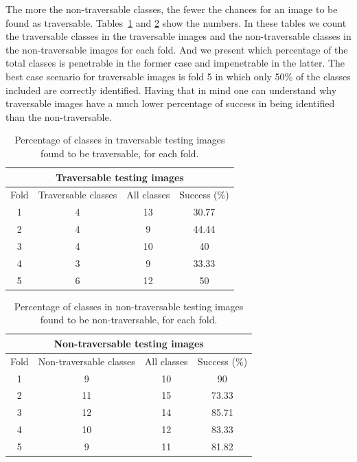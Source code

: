 \documentclass[12pt,a4paper,table,dvipsnames,tikz]{report}
\newcommand{\bl}[1]{{\hypersetup{linkcolor=blue}#1}}
\begin{document}
	The more the non-traversable classes, the fewer the chances for an image to be found as 
	traversable. Tables~\bl{\ref{table:trav.classes}} and \bl{\ref{table:obst.classes}} show 
	the numbers. In these tables we count the traversable classes in the traversable images 
	and the non-traversable classes in the non-traversable images for each fold. And we present 
	which percentage of the total classes is penetrable in the former case and impenetrable 
	in the latter. The best case scenario for traversable images is fold 5 in which only 50\% 
	of the classes included are correctly identified. Having that in mind one can understand 
	why traversable images have a much lower percentage of success in being identified than 
	the non-traversable.
	\\
	
	
	\begin{table}[h!]
		\centering
		\begin{tabular}{|c|c|c|c|}
			\hline
			\multicolumn{4}{|c|}{Traversable testing images}\\
			\hline
			Fold & Traversable classes & All classes & Success (\%)\\
			\hline
			1 & 4 & 13 & 30.77\\
			\hline
			2 & 4 & 9 & 44.44\\
			\hline
			3 & 4 & 10 & 40\\
			\hline
			4 & 3 & 9 & 33.33\\
			\hline
			5 & 6 & 12 & 50\\
			\hline
		\end{tabular}
		\caption{Percentage of classes in traversable testing images found to be traversable, 
			for each fold.}
		\label{table:trav.classes}
	\end{table}
	
	\begin{table}[h!]
		\centering
		\begin{tabular}{|c|c|c|c|}
			\hline
			\multicolumn{4}{|c|}{Non-traversable testing images}\\
			\hline
			Fold & Non-traversable classes & All classes & Success (\%)\\
			\hline
			1 & 9 & 10 & 90\\
			\hline
			2 & 11 & 15 & 73.33\\
			\hline
			3 & 12 & 14 & 85.71\\
			\hline
			4 & 10 & 12 & 83.33\\
			\hline
			5 & 9 & 11 & 81.82\\
			\hline
		\end{tabular}
		\caption{Percentage of classes in non-traversable testing images found to be 
			non-traversable, for each fold.}
		\label{table:obst.classes}
	\end{table}
	
\end{document}
